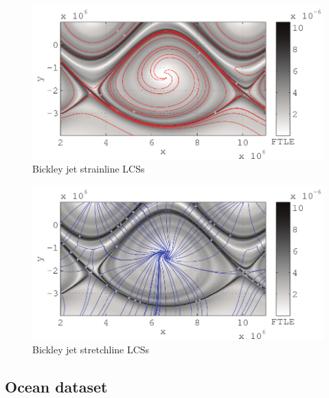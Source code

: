 \documentclass{article}
\begin{document}
\begin{figure}
  \centering
  \includegraphics[width=.85\textwidth]{graphics/bickley_jet/strain_lcs}
  \caption{Bickley jet strainline LCSs}
  \label{fig:Bickley_jet_strain_lcs}
\end{figure}

\begin{figure}
  \centering
  \includegraphics[width=.85\textwidth]{graphics/bickley_jet/stretch_lcs}
  \caption{Bickley jet stretchline LCSs}
  \label{fig:Bickley_jet_stretch_lcs}
\end{figure}

\clearpage

\subsection{Ocean dataset}
\label{sec:oceandataset}
\end{document}

